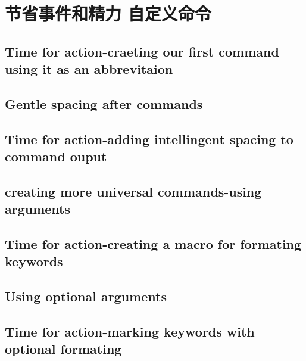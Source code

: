 \section{节省事件和精力 自定义命令}
	\subsection{Time for action-craeting our first command using it as an abbrevitaion}
	\subsection{Gentle spacing after commands}
	\subsection{Time for action-adding intellingent spacing to command ouput}
	\subsection{creating more universal commands-using arguments}
	\subsection{Time for action-creating a macro for formating keywords}
	\subsection{Using optional arguments}
	\subsection{Time for action-marking keywords with optional formating}

